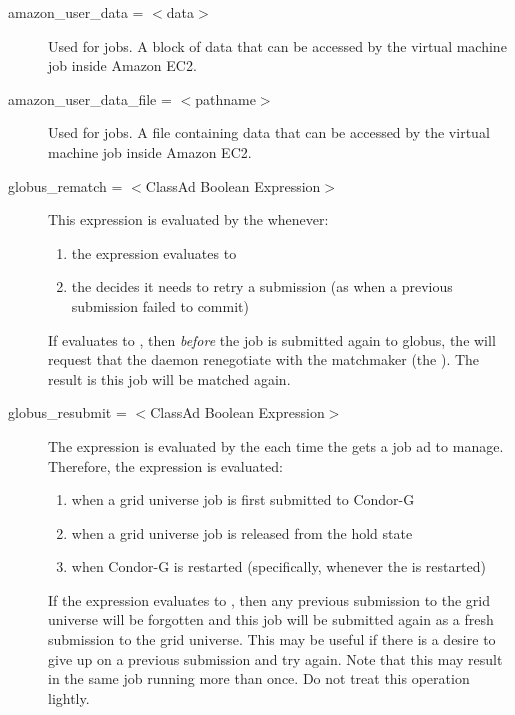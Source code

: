 \begin{description}

\item[amazon\_user\_data = $<$data$>$]
Used for  jobs. A block of data that can be accessed
by the virtual machine job inside Amazon EC2.


\item[amazon\_user\_data\_file = $<$pathname$>$]
Used for  jobs.
A file containing data that can be accessed
by the virtual machine job inside Amazon EC2.


\label{condor-submit-globus-rematch}
\item[globus\_rematch = $<$ClassAd Boolean Expression$>$]
This expression is evaluated by the  whenever:
\begin{enumerate}
\item
   the  expression evaluates to 
\item
   the  decides it needs to retry a submission
   (as when a previous submission failed to commit)
\end{enumerate}
If  evaluates to ,
then \emph{before} the job is submitted again to globus,
the  will request that the 
daemon renegotiate
with the matchmaker (the ).
The result is this job will be matched again.


\label{condor-submit-globus-resubmit}
\item[globus\_resubmit = $<$ClassAd Boolean Expression$>$]
The expression is evaluated by the  each time
the  gets a job ad to manage.
Therefore, the expression is evaluated:
\begin{enumerate}
\item
   when a grid universe job is first submitted to Condor-G
\item
   when a grid universe job is released from the hold state
\item
   when Condor-G is restarted (specifically, whenever the 
   is restarted)
\end{enumerate}
If the expression evaluates to ,
then any previous submission to the grid universe will be
forgotten and this job will be submitted again as a fresh submission to
the grid universe.
This may be useful if there is a desire to give up on a
previous submission and try again.
Note that this may result in the same job running more than
once.  Do not treat this operation lightly.


\end{description}
